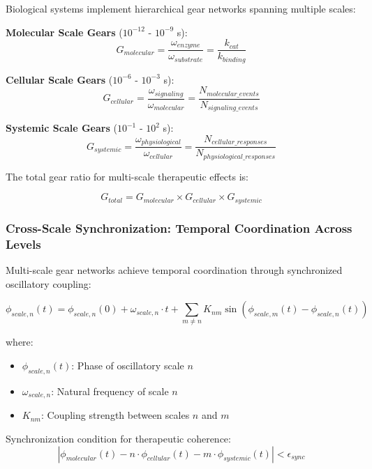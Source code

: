\documentclass[12pt,a4paper]{article}
\begin{document}
Biological systems implement hierarchical gear networks spanning multiple scales:

\textbf{Molecular Scale Gears} ($10^{-12}$ - $10^{-9}$ s):
\begin{equation}
G_{molecular} = \frac{\omega_{enzyme}}{\omega_{substrate}} = \frac{k_{cat}}{k_{binding}}
\end{equation}

\textbf{Cellular Scale Gears} ($10^{-6}$ - $10^{-3}$ s):
\begin{equation}
G_{cellular} = \frac{\omega_{signaling}}{\omega_{molecular}} = \frac{N_{molecular\_events}}{N_{signaling\_events}}
\end{equation}

\textbf{Systemic Scale Gears} ($10^{-1}$ - $10^{2}$ s):
\begin{equation}
G_{systemic} = \frac{\omega_{physiological}}{\omega_{cellular}} = \frac{N_{cellular\_responses}}{N_{physiological\_responses}}
\end{equation}

The total gear ratio for multi-scale therapeutic effects is:

\begin{equation}
G_{total} = G_{molecular} \times G_{cellular} \times G_{systemic}
\end{equation}

\subsubsection{Cross-Scale Synchronization: Temporal Coordination Across Levels}

Multi-scale gear networks achieve temporal coordination through synchronized oscillatory coupling:

\begin{equation}
\phi_{scale,n}(t) = \phi_{scale,n}(0) + \omega_{scale,n} \cdot t + \sum_{m \neq n} K_{nm} \sin(\phi_{scale,m}(t) - \phi_{scale,n}(t))
\end{equation}

where:
\begin{itemize}
\item $\phi_{scale,n}(t)$: Phase of oscillatory scale $n$
\item $\omega_{scale,n}$: Natural frequency of scale $n$
\item $K_{nm}$: Coupling strength between scales $n$ and $m$
\end{itemize}

Synchronization condition for therapeutic coherence:
\begin{equation}
|\phi_{molecular}(t) - n \cdot \phi_{cellular}(t) - m \cdot \phi_{systemic}(t)| < \epsilon_{sync}
\end{equation}
\end{document}
